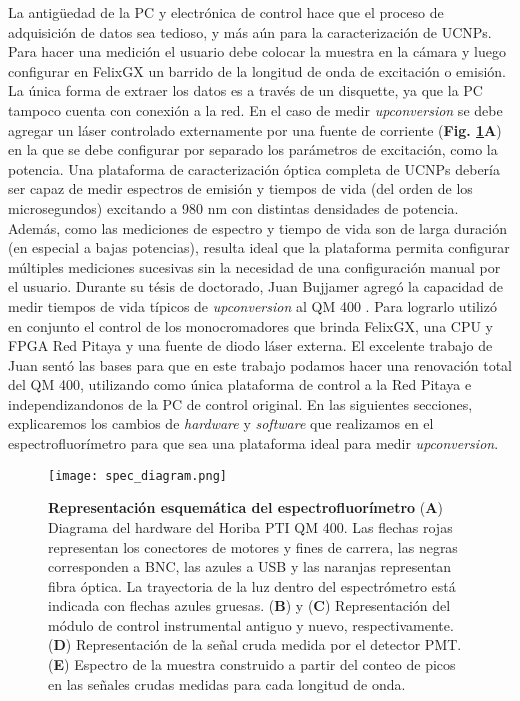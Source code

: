 La antigüedad de la PC y electrónica de control hace que el proceso de adquisición de datos sea tedioso, y más aún para la caracterización de UCNPs.
Para hacer una medición el usuario debe colocar la muestra en la cámara y luego configurar en FelixGX un barrido de la longitud de onda de excitación o emisión.
La única forma de extraer los datos es a través de un disquette, ya que la PC tampoco cuenta con conexión a la red.
En el caso de medir \textit{upconversion} se debe agregar un láser controlado externamente por una fuente de corriente (\textbf{Fig. \ref{fig:ref-diagram}A}) en la que se debe configurar por separado los parámetros de excitación, como la potencia.
Una plataforma de caracterización óptica completa de UCNPs debería ser capaz de medir espectros de emisión y tiempos de vida (del orden de los microsegundos) excitando a 980 nm con distintas densidades de potencia.
Además, como las mediciones de espectro y tiempo de vida son de larga duración (en especial a bajas potencias), resulta ideal que la plataforma permita configurar múltiples mediciones sucesivas sin la necesidad de una configuración manual por el usuario.
Durante su tésis de doctorado, Juan Bujjamer agregó la capacidad de medir tiempos de vida típicos de \textit{upconversion} al QM 400 \cite{bujjamer2020}. 
Para lograrlo utilizó en conjunto el control de los monocromadores que brinda FelixGX, una CPU y FPGA Red Pitaya y una fuente de diodo láser externa.
El excelente trabajo de Juan sentó las bases para que en este trabajo podamos hacer una renovación total del QM 400, utilizando como única plataforma de control a la Red Pitaya e independizandonos de la PC de control original.
En las siguientes secciones, explicaremos los cambios de \textit{hardware} y \textit{software} que realizamos en el espectrofluorímetro para que sea una plataforma ideal para medir \textit{upconversion}.



\begin{figure}[btp]
     \centering
     \texttt{[image: spec\_diagram.png]}
     \caption{
     \textbf{Representación esquemática del espectrofluorímetro}
     (\textbf{A}) Diagrama del hardware del Horiba PTI QM 400. Las flechas rojas representan los conectores de motores y fines de carrera, las negras corresponden a BNC, las azules a USB y las naranjas representan fibra óptica. La trayectoria de la luz dentro del espectrómetro está indicada con flechas azules gruesas.
     (\textbf{B}) y (\textbf{C}) Representación del módulo de control instrumental antiguo y nuevo, respectivamente.
     (\textbf{D}) Representación de la señal cruda medida por el detector PMT.
     (\textbf{E}) Espectro de la muestra construido a partir del conteo de picos en las señales crudas medidas para cada longitud de onda.
    }
     \label{fig:ref-diagram}
\end{figure}

